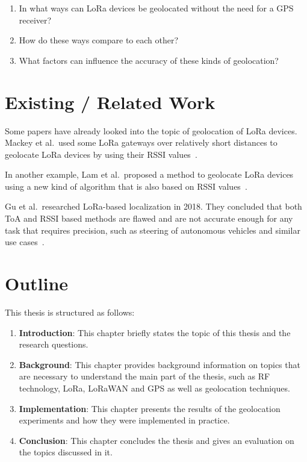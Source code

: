 \begin{enumerate}
      \item In what ways can \ac{LoRa} devices be geolocated without the need for a \ac{GPS} receiver?
      \item How do these ways compare to each other?
      \item What factors can influence the accuracy of these kinds of geolocation?
\end{enumerate}

\section{Existing / Related Work}

Some papers have already looked into the topic of geolocation of \ac{LoRa} devices.
Mackey et al.~used some \ac{LoRa} gateways over relatively short distances to geolocate \ac{LoRa} devices by using their \ac{RSSI} values~\cite{mackey_lora-based_2019}.

In another example, Lam et al.~proposed a method to geolocate \ac{LoRa} devices using a new kind of algorithm that is also based on \ac{RSSI} values~\cite{lam_new_2018}.

Gu et al.\ researched \ac{LoRa}-based localization in 2018.
They concluded that both \ac{ToA} and \ac{RSSI} based methods are flawed and are not accurate enough for any task that requires precision, such as steering of autonomous vehicles and similar use cases~\cite{gu_lora-based_2018}.


\section{Outline}

This thesis is structured as follows:

\begin{enumerate}
      \item \textbf{Introduction}:
            This chapter briefly states the topic of this thesis and the research questions.
      \item \textbf{Background}:
            This chapter provides background information on topics that are necessary to understand the main part of the thesis, such as \ac{RF} technology, \ac{LoRa}, \ac{LoRaWAN} and \ac{GPS} as well as geolocation techniques.
      \item \textbf{Implementation}:
            This chapter presents the results of the geolocation experiments and how they were implemented in practice.
      \item \textbf{Conclusion}:
            This chapter concludes the thesis and gives an evaluation on the topics discussed in it.
\end{enumerate}

